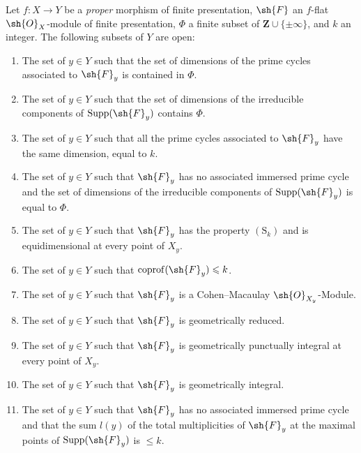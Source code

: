 \begin{theorem}[12.2.1]
\label{IV.12.2.1}
Let $f:X\to Y$ be a \emph{proper} morphism of finite presentation, $\sh{F}$ an $f$-flat $\sh{O}_X$-module of finite presentation, $\Phi$ a finite subset of $\mathbf{Z}\cup\{\pm\infty\}$, and $k$ an integer.
The following subsets of $Y$ are open:
\begin{enumerate}[label=(\roman*)]
  \item The set of $y\in Y$ such that the set of dimensions of the prime cycles associated to $\sh{F}_y$ is contained in $\Phi$.
  \item The set of $y\in Y$ such that the set of dimensions of the irreducible components of $\operatorname{Supp}(\sh{F}_y)$ contains $\Phi$.
  \item The set of $y\in Y$ such that all the prime cycles associated to $\sh{F}_y$ have the same dimension, equal to $k$.
  \item The set of $y\in Y$ such that $\sh{F}_y$ has no associated immersed prime cycle and the set of dimensions of the irreducible components of $\operatorname{Supp}(\sh{F}_y)$ is equal to $\Phi$.
  \item The set of $y\in Y$ such that $\sh{F}_y$ has the property $(\mathrm{S}_k)$ and is equidimensional at every point of $X_y$.
  \item The set of $y\in Y$ such that $\operatorname{coprof}(\sh{F}_y)\leqslant k$.
  \item The set of $y\in Y$ such that $\sh{F}_y$ is a Cohen--Macaulay $\sh{O}_{X_y}$-Module.
  \item The set of $y\in Y$ such that $\sh{F}_y$ is geometrically reduced.
  \item The set of $y\in Y$ such that $\sh{F}_y$ is geometrically punctually integral at every point of $X_y$.
  \item The set of $y\in Y$ such that $\sh{F}_y$ is geometrically integral.
  \item The set of $y\in Y$ such that $\sh{F}_y$ has no associated immersed prime cycle and that the sum $l(y)$ of the total multiplicities  of $\sh{F}_y$ at the maximal points of $\operatorname{Supp}(\sh{F}_y)$ is $\leqslant k$.
\end{enumerate}
\end{theorem}

